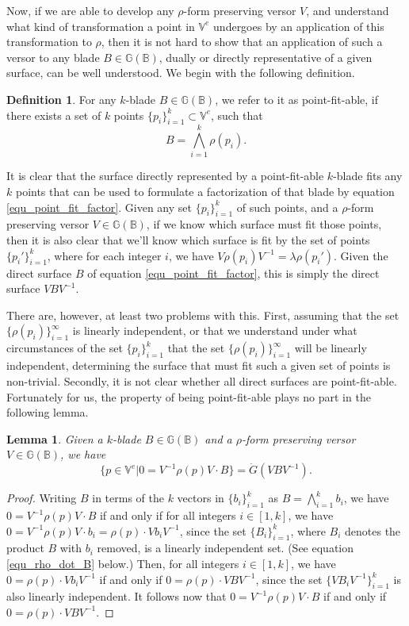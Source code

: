 \documentclass{birkjour}
\newtheorem{lem}[thm]{Lemma}
\theoremstyle{definition}
\newtheorem{defn}[thm]{Definition}
\theoremstyle{remark}
\numberwithin{equation}{section}
\newcommand{\G}{\mathbb{G}}
\newcommand{\V}{\mathbb{V}}
\newcommand{\B}{\mathbb{B}}
\newcommand{\Gi}{\dot{G}}
\begin{document}
Now, if we are able to develop any $\rho$-form preserving versor $V$,
and understand what kind of transformation a point in $\V^e$ undergoes by an application
of this transformation to $\rho$, then it is not hard to show that an application of
such a versor to any blade $B\in\G(\B)$, dually or directly representative of a given surface,
can be well understood.
We begin with the following definition.
\begin{defn}
For any $k$-blade $B\in\G(\B)$, we refer to it as point-fit-able, if there
exists a set of $k$ points $\{p_i\}_{i=1}^k\subset\V^e$, such that
\begin{equation}\label{equ_point_fit_factor}
B = \bigwedge_{i=1}^k\rho(p_i).
\end{equation}
\end{defn}
It is clear that the surface directly represented by a point-fit-able $k$-blade fits
any $k$ points that can be used to formulate a factorization of that blade
by equation \eqref{equ_point_fit_factor}.  Given any set $\{p_i\}_{i=1}^k$ of such points,
and a $\rho$-form preserving versor $V\in\G(\B)$,
if we know which surface must fit those points, then it is also clear that
we'll know which surface is fit by the set of points $\{p_i'\}_{i=1}^k$,
where for each integer $i$, we have $V\rho(p_i)V^{-1}=\lambda\rho(p_i')$.
Given the direct surface $B$ of equation \eqref{equ_point_fit_factor}, this is simply the
direct surface $VBV^{-1}$.

There are, however, at least two problems with this.  First, assuming that
the set $\{\rho(p_i)\}_{i=1}^\infty$ is linearly independent, or that
we understand under what circumstances of the set $\{p_i\}_{i=1}^k$
that the set $\{\rho(p_i)\}_{i=1}^\infty$ will be linearly independent, determining the
surface that must fit such a given set of points is non-trivial.
Secondly, it is not clear whether all direct surfaces are point-fit-able.
Fortunately for us, the property of being point-fit-able plays no
part in the following lemma.

\begin{lem}\label{lem_xform_dual_geo}
Given a $k$-blade $B\in\G(\B)$ and a $\rho$-form preserving versor $V\in\G(\B)$,
we have
\begin{equation}
\{p\in\V^e|0=V^{-1}\rho(p)V\cdot B\}=\Gi(VBV^{-1}).
\end{equation}
\end{lem}
\begin{proof}
Writing $B$ in terms of the $k$ vectors in $\{b_i\}_{i=1}^k$ as $B=\bigwedge_{i=1}^k b_i$,
we have $0=V^{-1}\rho(p)V\cdot B$ if and only if for all integers $i\in[1,k]$,
we have $0=V^{-1}\rho(p)V\cdot b_i=\rho(p)\cdot Vb_iV^{-1}$, since the
set $\{B_i\}_{i=1}^k$, where $B_i$ denotes the product $B$ with $b_i$ removed,
is a linearly independent set.  (See equation \eqref{equ_rho_dot_B} below.)
Then, for all integers $i\in[1,k]$, we have $0=\rho(p)\cdot Vb_iV^{-1}$
if and only if $0=\rho(p)\cdot VBV^{-1}$, since
the set $\{VB_iV^{-1}\}_{i=1}^k$ is also linearly independent.
It follows now that $0=V^{-1}\rho(p)V\cdot B$ if and only if $0=\rho(p)\cdot VBV^{-1}$.
\end{proof}
\end{document}
